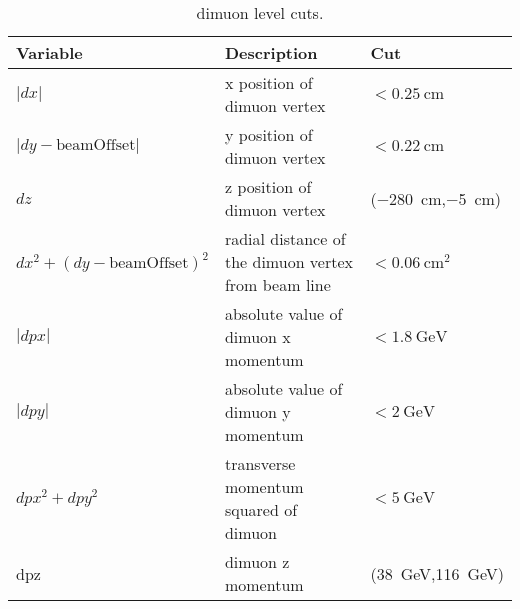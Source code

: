 \documentclass[../main.tex]{subfiles}
\begin{document}
\begin{table}[ht!]
	\centering
	\caption{dimuon level cuts.}
	\label{table:dimuonCut}
	\begin{tabular}{|m{4.5cm}|m{7cm}|m{3cm}|}
		\hline
		Variable                                                                                            & Description                                                                              & Cut                            \\ \hline
		$|dx|$                                                                                              & x position of dimuon vertex                                                              & $<\SI{0.25}{\cm}$              \\ \hline
		$|dy-\textrm{beamOffset}|$                                                                          & y position of dimuon vertex                                                              & $<\SI{0.22}{\cm}$              \\ \hline
		$dz$                                                                                                & z position of dimuon vertex                                                              & (\SI{-280}{\cm},\SI{-5}{\cm})  \\ \hline
		$dx^2+(dy-\textrm{beamOffset})^2$                                                                   & radial distance of the dimuon vertex from beam line                                      & $<\SI{0.06}{\cm\squared}$      \\ \hline
		$|dpx|$                                                                                             & absolute value of dimuon x   momentum                                                    & $<\SI{1.8}{\GeV}$              \\ \hline
		$|dpy|$                                                                                             & absolute value of dimuon y   momentum                                                    & $<\SI{2}{\GeV}$                \\ \hline
		$dpx^2+dpy^2$                                                                                       & transverse momentum squared of   dimuon                                                  & $<\SI{5}{\GeV}$                \\ \hline
		dpz                                                                                                 & dimuon z momentum                                                                        & (\SI{38}{\GeV},\SI{116}{\GeV}) \\ \hline

\end{tabular}
\end{table}
\end{document}
